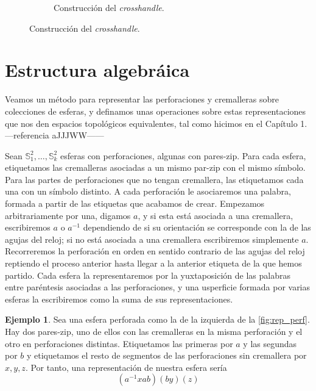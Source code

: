 \documentclass[10pt]{report}
\newcommand{\Esfera}{\mathbb{S}^2}
\theoremstyle{definition}
\newtheorem{eje}[defin]{Ejemplo}
\begin{document}
\begin{figure}
\begin{subfigure}{1\textwidth}
\caption{Construcción del \textit{crosshandle}.\label{fig:crosshandle}}
\end{subfigure}
\end{figure}



\section{Estructura algebráica}
Veamos un método para representar las perforaciones y cremalleras sobre colecciones de esferas, y definamos unas operaciones sobre estas representaciones que nos den espacios topológicos equivalentes, tal como hicimos en el Capítulo 1. ---referencia aJJJWW------ 

Sean $\Esfera_1,\dots ,\Esfera_k$ esferas con perforaciones, algunas con pares-zip. Para cada esfera, etiquetamos las cremalleras asociadas a un mismo par-zip con el mismo símbolo. Para las partes de perforaciones que no tengan cremallera, las etiquetamos cada una con un símbolo distinto. A cada perforación le asociaremos una palabra, formada a partir de las etiquetas que acabamos de crear. Empezamos arbitrariamente por una, digamos $a$, y si esta está asociada a una cremallera, escribiremos $a$ o $a^{-1}$ dependiendo de si su orientación se corresponde con la de las agujas del reloj; si no está asociada a una cremallera escribiremos simplemente $a$. Recorreremos la perforación en orden en sentido contrario de las agujas del reloj reptiendo el proceso anterior hasta llegar a la anterior etiqueta de la que hemos partido.
Cada esfera la representaremos por la yuxtaposición de las palabras entre paréntesis asociadas a las perforaciones, y una usperficie formada por varias esferas la escribiremos como la suma de sus representaciones.

\begin{eje}\label{eje:rep_perf}
Sea una esfera perforada como la de la izquierda de la \autoref{fig:rep_perf}. Hay dos pares-zip, uno de ellos con las cremalleras en la misma perforación y el otro en perforaciones distintas. Etiquetamos las primeras por $a$ y las segundas por $b$ y etiquetamos el resto de segmentos de las perforaciones sin cremallera por $x,y,z$. Por tanto, una representación de nuestra esfera sería $$(a^{-1}xab)(by)(z)$$
\end{eje}
\end{document}
